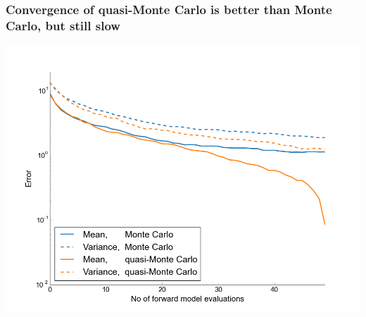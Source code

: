 \documentclass[handout]{beamer}
\begin{document}
\begin{frame}
  \frametitle{Convergence of quasi-Monte Carlo is better than Monte Carlo, but still slow}
\vspace{-5mm}
  \begin{center}
    \includegraphics[width=1\textwidth]{qMC-MC_convergence_2D.png}
  \end{center}
\end{frame}






\end{document}
